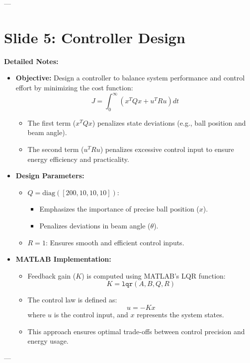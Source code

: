 \documentclass[12pt]{article}
\begin{document}
---
\newpage
\section*{Slide 5: Controller Design}
\textbf{Detailed Notes:}
\begin{itemize}
    \item \textbf{Objective:} Design a controller to balance system performance and control effort by minimizing the cost function:
    \[
    J = \int_0^\infty \left( x^T Q x + u^T R u \right) dt
    \]
    \begin{itemize}
        \item The first term (\(x^T Q x\)) penalizes state deviations (e.g., ball position and beam angle).
        \item The second term (\(u^T R u\)) penalizes excessive control input to ensure energy efficiency and practicality.
    \end{itemize}
    \item \textbf{Design Parameters:}
    \begin{itemize}
        \item \(Q = \text{diag}([200, 10, 10, 10])\):
        \begin{itemize}
            \item Emphasizes the importance of precise ball position (\(x\)).
            \item Penalizes deviations in beam angle (\(\theta\)).
        \end{itemize}
        \item \(R = 1\): Ensures smooth and efficient control inputs.
    \end{itemize}
    \item \textbf{MATLAB Implementation:}
    \begin{itemize}
        \item Feedback gain (\(K\)) is computed using MATLAB's LQR function:
        \[
        K = \texttt{lqr}(A, B, Q, R)
        \]
        \item The control law is defined as:
        \[
        u = -Kx
        \]
        where \(u\) is the control input, and \(x\) represents the system states.
        \item This approach ensures optimal trade-offs between control precision and energy usage.
    \end{itemize}
\end{itemize}

---
\newpage
\end{document}
